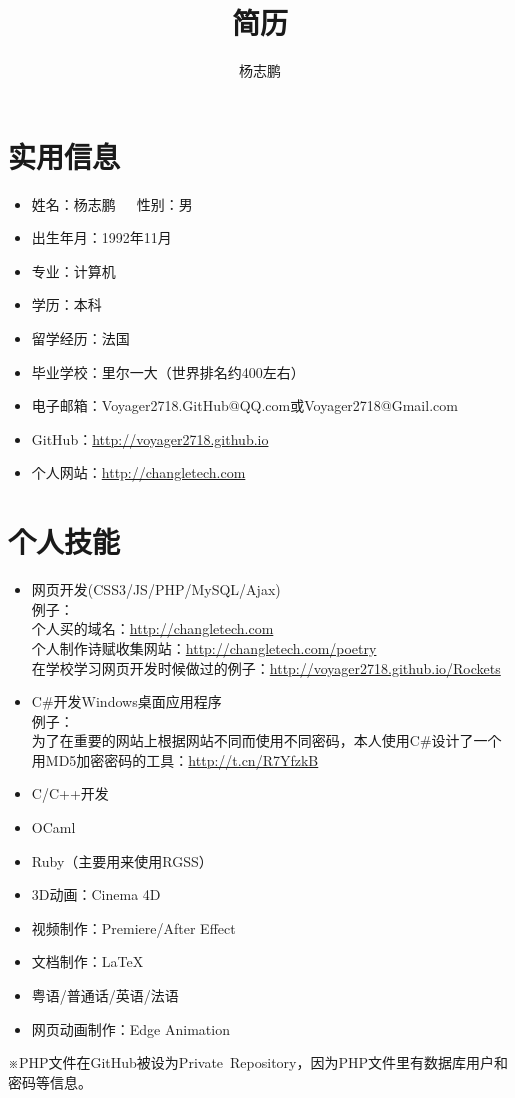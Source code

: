 \documentclass[UTF8]{ctexart}
\title{简历}
\author{杨志鹏}
\begin{document}
\maketitle
\pagestyle{fancy}
\tableofcontents{}
\newpage
\section{实用信息}
\begin{itemize}
\item 姓名：杨志鹏\ \ \ 性别：男
\item 出生年月：1992年11月
\item 专业：计算机
\item 学历：本科
\item 留学经历：法国
\item 毕业学校：里尔一大（世界排名约400左右）
\item 电子邮箱：Voyager2718.GitHub@QQ.com或Voyager2718@Gmail.com
\item GitHub：\url{http://voyager2718.github.io}
\item 个人网站：\url{http://changletech.com}
\end{itemize}
\section{个人技能}
\begin{itemize}
\item 网页开发(CSS3/JS/PHP/MySQL/Ajax)\\
例子：\\
个人买的域名：\url{http://changletech.com}\\
个人制作诗赋收集网站：\url{http://changletech.com/poetry}\\
在学校学习网页开发时候做过的例子：\url{http://voyager2718.github.io/Rockets}
\item C\#{}开发Windows桌面应用程序\\
例子：\\
为了在重要的网站上根据网站不同而使用不同密码，本人使用C\#{}设计了一个用MD5加密密码的工具：\url{http://t.cn/R7YfzkB}
\item C/C++开发
\item OCaml
\item Ruby（主要用来使用RGSS）
\item 3D动画：Cinema 4D
\item 视频制作：Premiere/After Effect
\item 文档制作：\LaTeX
\item 粤语/普通话/英语/法语
\item 网页动画制作：Edge Animation
\end{itemize}
※PHP文件在GitHub被设为Private\ Repository，因为PHP文件里有数据库用户和密码等信息。
\end{document}
